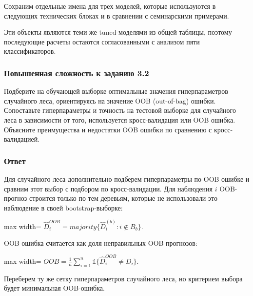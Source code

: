 \documentclass[11pt]{article}
\begin{document}
    Сохраним отдельные имена для трех моделей, которые используются в
следующих технических блоках и в сравнении с семинарскими примерами.

    Эти объекты являются теми же tuned-моделями из общей таблицы, поэтому
последующие расчеты остаются согласованными с анализом пяти
классификаторов.

    \subsubsection{Повышенная сложность к заданию
3.2}\label{ux43fux43eux432ux44bux448ux435ux43dux43dux430ux44f-ux441ux43bux43eux436ux43dux43eux441ux442ux44c-ux43a-ux437ux430ux434ux430ux43dux438ux44e-3.2}

Подберите на обучающей выборке оптимальные значения гиперпараметров
случайного леса, ориентируясь на значение OOB (out-of-bag) ошибки.
Сопоставьте гиперпараметры и точность на тестовой выборке для случайного
леса в зависимости от того, используется кросс-валидация или OOB ошибка.
Объясните преимущества и недостатки OOB ошибки по сравнению с
кросс-валидацией.

\subsubsection{Ответ}

Для случайного леса дополнительно подберем гиперпараметры по OOB-ошибке
и сравним этот выбор с подбором по кросс-валидации. Для наблюдения \(i\)
OOB-прогноз строится только по тем деревьям, которые не использовали это
наблюдение в своей bootstrap-выборке:

\begin{center}
\begin{adjustbox}{max width=\linewidth}
\(\displaystyle \hat D_i^{OOB} = majority\{\hat D_i^{(b)}: i \notin B_b\}.\)
\end{adjustbox}
\end{center}

OOB-ошибка считается как доля неправильных OOB-прогнозов:

\begin{center}
\begin{adjustbox}{max width=\linewidth}
\(\displaystyle OOB = \frac{1}{n}\sum_{i=1}^{n}\mathbb{1}\{\hat D_i^{OOB} \ne D_i\}.\)
\end{adjustbox}
\end{center}

    Переберем ту же сетку гиперпараметров случайного леса, но критерием
выбора будет минимальная OOB-ошибка.
\end{document}
